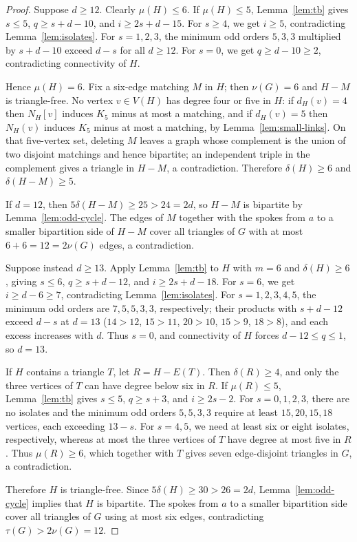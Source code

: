 \documentclass[11pt]{article}
\begin{document}
\begin{proof}
Suppose $d\geq 12$. Clearly $\mu(H)\leq 6$. If $\mu(H)\leq 5$, Lemma~\ref{lem:tb} gives $s\leq 5$, $q\geq s+d-10$, and $i\geq 2s+d-15$. For $s\geq 4$, we get $i\geq 5$, contradicting Lemma~\ref{lem:isolates}. For $s=1,2,3$, the minimum odd orders $5,3,3$ multiplied by $s+d-10$ exceed $d-s$ for all $d\geq 12$. For $s=0$, we get $q\geq d-10\geq 2$, contradicting connectivity of $H$.

Hence $\mu(H)=6$. Fix a six-edge matching $M$ in $H$; then $\nu(G)=6$ and $H-M$ is triangle-free. No vertex $v\in V(H)$ has degree four or five in $H$: if $d_H(v)=4$ then $N_H[v]$ induces $K_5$ minus at most a matching, and if $d_H(v)=5$ then $N_H(v)$ induces $K_5$ minus at most a matching, by Lemma~\ref{lem:small-links}. On that five-vertex set, deleting $M$ leaves a graph whose complement is the union of two disjoint matchings and hence bipartite; an independent triple in the complement gives a triangle in $H-M$, a contradiction. Therefore $\delta(H)\geq 6$ and $\delta(H-M)\geq 5$.

If $d=12$, then $5\delta(H-M)\geq 25>24=2d$, so $H-M$ is bipartite by Lemma~\ref{lem:odd-cycle}. The edges of $M$ together with the spokes from $a$ to a smaller bipartition side of $H-M$ cover all triangles of $G$ with at most $6+6=12=2\nu(G)$ edges, a contradiction.

Suppose instead $d\geq 13$. Apply Lemma~\ref{lem:tb} to $H$ with $m=6$ and $\delta(H)\geq 6$, giving $s\leq 6$, $q\geq s+d-12$, and $i\geq 2s+d-18$. For $s=6$, we get $i\geq d-6\geq 7$, contradicting Lemma~\ref{lem:isolates}. For $s=1,2,3,4,5$, the minimum odd orders are $7,5,5,3,3$, respectively; their products with $s+d-12$ exceed $d-s$ at $d=13$ ($14>12$, $15>11$, $20>10$, $15>9$, $18>8$), and each excess increases with $d$. Thus $s=0$, and connectivity of $H$ forces $d-12\leq q\leq 1$, so $d=13$.

If $H$ contains a triangle $T$, let $R=H-E(T)$. Then $\delta(R)\geq 4$, and only the three vertices of $T$ can have degree below six in $R$. If $\mu(R)\leq 5$, Lemma~\ref{lem:tb} gives $s\leq 5$, $q\geq s+3$, and $i\geq 2s-2$. For $s=0,1,2,3$, there are no isolates and the minimum odd orders $5,5,3,3$ require at least $15,20,15,18$ vertices, each exceeding $13-s$. For $s=4,5$, we need at least six or eight isolates, respectively, whereas at most the three vertices of $T$ have degree at most five in $R$. Thus $\mu(R)\geq 6$, which together with $T$ gives seven edge-disjoint triangles in $G$, a contradiction.

Therefore $H$ is triangle-free. Since $5\delta(H)\geq 30>26=2d$, Lemma~\ref{lem:odd-cycle} implies that $H$ is bipartite. The spokes from $a$ to a smaller bipartition side cover all triangles of $G$ using at most six edges, contradicting $\tau(G)>2\nu(G)=12$.
\end{proof}
\end{document}
